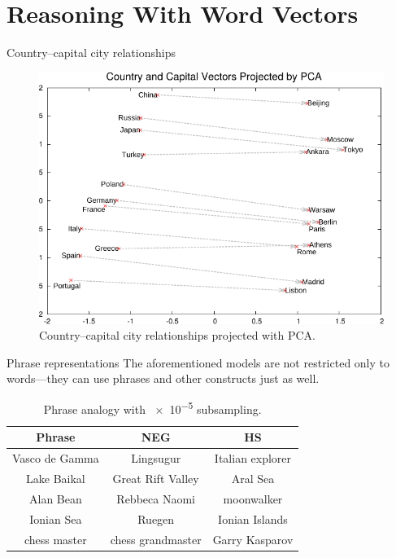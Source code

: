 \documentclass[serif, xcolor={svgnames, table}, usepdftitle=false]{beamer}
\begin{document}
\section{Reasoning With Word Vectors}

\begin{frame}{Country--capital city relationships}
  \begin{figure}
    \centering
    \includegraphics[width=.75\textwidth]{Country--Capital_Vectors.pdf}
    \caption{Country--capital city relationships projected with PCA.}
  \end{figure}  
\end{frame}

\begin{frame}{Phrase representations}
  The aforementioned models are not restricted only to words---they can use
  phrases and other constructs just as well.
  \begin{table}
    \centering
    \caption{Phrase analogy with \num{e-5} subsampling.}
    \begin{tabular}{c c c}
      \toprule
      Phrase & NEG & HS \\
      \midrule
      Vasco de Gamma & Lingsugur & Italian explorer \\
      Lake Baikal & Great Rift Valley & Aral Sea \\
      Alan Bean & Rebbeca Naomi & moonwalker \\
      Ionian Sea & Ruegen & Ionian Islands \\
      chess master & chess grandmaster & Garry Kasparov \\
      \bottomrule
    \end{tabular}
  \end{table}
\end{frame}
\end{document}
